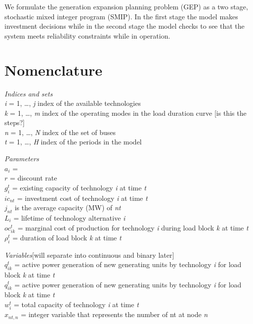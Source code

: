 \documentclass[10pt]{amsart}
\begin{document}
We formulate the generation expansion planning problem (GEP) as a two stage, stochastic mixed integer program (SMIP). 
In the first stage the model makes investment decisions while in the second stage the model checks to see that the system meets reliability constraints while in operation.

\section{Nomenclature}
\begin{flushleft}
\textit{Indices and sets}\\
\textit{i} = 1, \ldots, \textit{j} index of the available technologies \\ 
\textit{k} = 1, \ldots, \textit{m} index of the operating modes in the load duration curve [is this the steps?] \\
\textit{n} = 1, \ldots, \textit{N} index of the set of buses \\
\textit{t} = 1, \ldots, \textit{H} index of the periods in the model \\
\end{flushleft}

\begin{flushleft}
\textit{Parameters} \\
$a_i$ = \\
$r$ = discount rate \\
$g_i^t$ = existing capacity of technology \textit{i} at time \textit{t} \\
$ic_{nt}$ = investment cost of technology \textit{i} at time \textit{t} \\
$j_{nt}$ is the average capacity (MW) of \textit{nt} \\
$L_i$ = lifetime of technology alternative \textit{i} \\
$oc_{ik}^{t}$ = marginal cost of production for technology \textit{i} during load block \textit{k} at time \textit{t} \\
$\rho_{i}^{t}$ = duration of load block \textit{k} at time \textit{t} \\
\end{flushleft}

\begin{flushleft}
\textit{Variables}[will separate into continuous and binary later] \\
$q_{ik}^{t}$ = active power generation of new generating units by technology \textit{i} for load block \textit{k} at time \textit{t} \\
$q_{ik}^{t}$ = active power generation of new generating units by technology \textit{i} for load block \textit{k} at time \textit{t} \\
$w_{i}^{t}$ = total capacity of technology \textit{i} at time \textit{t} \\
$x_{nt, n}$ = integer variable that represents the number of nt at node \textit{n} \\
\end{flushleft}
\end{document}
